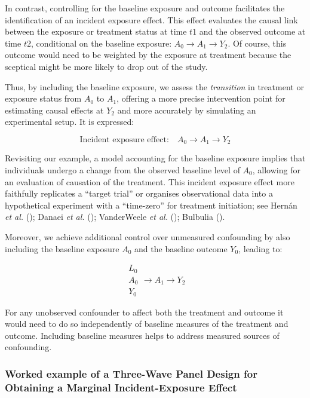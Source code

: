 \documentclass[
  singlecolumn]{article}
\begin{document}
In contrast, controlling for the baseline exposure and outcome
facilitates the identification of an incident exposure effect. This
effect evaluates the causal link between the exposure or treatment
status at time \(t1\) and the observed outcome at time \(t2\),
conditional on the baseline exposure: \(A_{0} \to A_{1} \to Y_{2}\). Of
course, this outcome would need to be weighted by the exposure at
treatment because the sceptical might be more likely to drop out of the
study.

Thus, by including the baseline exposure, we assess the
\emph{transition} in treatment or exposure status from \(A_0\) to
\(A_1\), offering a more precise intervention point for estimating
causal effects at \(Y_2\) and more accurately by simulating an
experimental setup. It is expressed:

\[
\text{Incident exposure effect:} \quad \boxed{A_{0}} \to A_{1} \to Y_{2}
\]

Revisiting our example, a model accounting for the baseline exposure
implies that individuals undergo a change from the observed baseline
level of \(A_0\), allowing for an evaluation of causation of the
treatment. This incident exposure effect more faithfully replicates a
``target trial'' or organises observational data into a hypothetical
experiment with a ``time-zero'' for treatment initiation; see Hernán
\emph{et al.} (); Danaei \emph{et al.}
(); VanderWeele \emph{et al.}
(); Bulbulia
().

Moreover, we achieve additional control over unmeasured confounding by
also including the baseline exposure \(A_0\) and the baseline outcome
\(Y_0\), leading to:

\[
\boxed{
\begin{aligned}
L_{0} \\
A_{0} \\
Y_{0}
\end{aligned}
}
\to A_{1} \to Y_{2}
\]

For any unobserved confounder to affect both the treatment and outcome
it would need to do so independently of baseline measures of the
treatment and outcome. Including baseline measures helps to address
measured sources of confounding.

\newpage{}

\subsubsection{Worked example of a Three-Wave Panel Design for Obtaining
a Marginal Incident-Exposure
Effect}\label{worked-example-of-a-three-wave-panel-design-for-obtaining-a-marginal-incident-exposure-effect}
\end{document}
